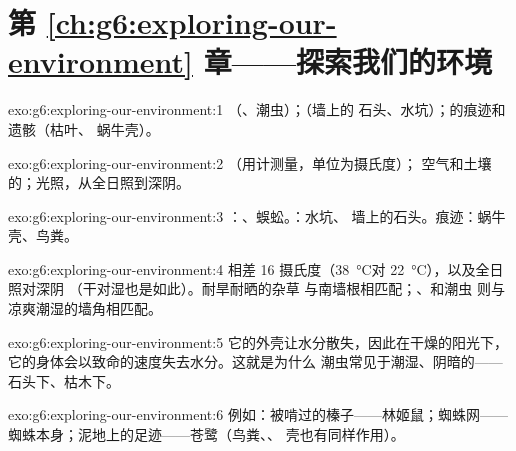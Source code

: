 \section*{第 \ref{ch:g6:exploring-our-environment} 章——探索我们的环境}

\begin{solution}{exo:g6:exploring-our-environment:1}
（、潮虫）；（墙上的
石头、水坑）；的痕迹和遗骸（枯叶、
蜗牛壳）。
\end{solution}

\begin{solution}{exo:g6:exploring-our-environment:2}
（用计测量，单位为摄氏度）；
空气和土壤的；光照，从全日照到深阴。
\end{solution}

\begin{solution}{exo:g6:exploring-our-environment:3}
：、蜈蚣。：水坑、
墙上的石头。痕迹：蜗牛壳、鸟粪。
\end{solution}

\begin{solution}{exo:g6:exploring-our-environment:4}
相差 16 摄氏度（\qty{38}{\degreeCelsius}对
\qty{22}{\degreeCelsius}），以及全日照对深阴
（干对湿也是如此）。耐旱耐晒的杂草
与南墙根相匹配；、和潮虫
则与凉爽潮湿的墙角相匹配。
\end{solution}

\begin{solution}{exo:g6:exploring-our-environment:5}
它的外壳让水分散失，因此在干燥的阳光下，
它的身体会以致命的速度失去水分。这就是为什么
潮虫常见于潮湿、阴暗的——石头下、枯木下。
\end{solution}

\begin{solution}{exo:g6:exploring-our-environment:6}
例如：被啃过的榛子——林姬鼠；蜘蛛网——
蜘蛛本身；泥地上的足迹——苍鹭（鸟粪、、
壳也有同样作用）。
\end{solution}

